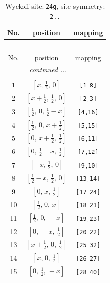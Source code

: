 \documentclass[fleqn,8pt]{jsarticle}
\begin{document}
\renewcommand{\arraystretch}{1.2}
\begin{longtable}{ccc}
\caption{Wyckoff site: {\tt 24g}, site symmetry: {\tt 2..}}
 \\
 \hline \hline
No. & position & mapping \\ \hline \endfirsthead

\multicolumn{2}{l}{\tablename\ \thetable{}} \\
 \hline \hline
No. & position & mapping \\ \hline \endhead

 \hline \hline
\multicolumn{2}{r}{\footnotesize\it continued ...} \\ \endfoot

 \hline \hline
\multicolumn{2}{r}{} \\ \endlastfoot

1 & $\left[ x,\, \frac{1}{2},\, 0 \right]$ & {\tt [1,8]} \\ \hline
2 & $\left[ x + \frac{1}{2},\, \frac{1}{2},\, 0 \right]$ & {\tt [2,3]} \\ \hline
3 & $\left[ \frac{1}{2},\, 0,\, \frac{1}{2} - x \right]$ & {\tt [4,16]} \\ \hline
4 & $\left[ \frac{1}{2},\, 0,\, x + \frac{1}{2} \right]$ & {\tt [5,15]} \\ \hline
5 & $\left[ 0,\, x + \frac{1}{2},\, \frac{1}{2} \right]$ & {\tt [6,11]} \\ \hline
6 & $\left[ 0,\, \frac{1}{2} - x,\, \frac{1}{2} \right]$ & {\tt [7,12]} \\ \hline
7 & $\left[ - x,\, \frac{1}{2},\, 0 \right]$ & {\tt [9,10]} \\ \hline
8 & $\left[ \frac{1}{2} - x,\, \frac{1}{2},\, 0 \right]$ & {\tt [13,14]} \\ \hline
9 & $\left[ 0,\, x,\, \frac{1}{2} \right]$ & {\tt [17,24]} \\ \hline
10 & $\left[ \frac{1}{2},\, 0,\, x \right]$ & {\tt [18,21]} \\ \hline
11 & $\left[ \frac{1}{2},\, 0,\, - x \right]$ & {\tt [19,23]} \\ \hline
12 & $\left[ 0,\, - x,\, \frac{1}{2} \right]$ & {\tt [20,22]} \\ \hline
13 & $\left[ x + \frac{1}{2},\, 0,\, \frac{1}{2} \right]$ & {\tt [25,32]} \\ \hline
14 & $\left[ x,\, 0,\, \frac{1}{2} \right]$ & {\tt [26,27]} \\ \hline
15 & $\left[ 0,\, \frac{1}{2},\, - x \right]$ & {\tt [28,40]} \\ \hline

\end{longtable}
\end{document}

